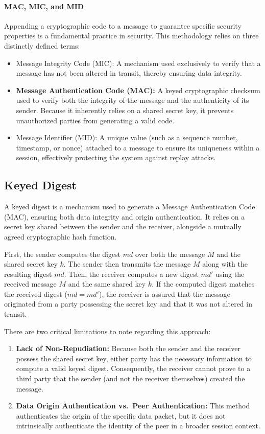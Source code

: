 \paragraph{MAC, MIC, and MID}
Appending a cryptographic code to a message to guarantee specific security properties is a fundamental practice in security. This methodology relies on three distinctly defined terms:
\begin{itemize}
    \item Message Integrity Code (MIC): A mechanism used exclusively to verify that a message has not been altered in transit, thereby ensuring data integrity.
    \item \textbf{Message Authentication Code (MAC):} A keyed cryptographic checksum used to verify both the integrity of the message and the authenticity of its sender. Because it inherently relies on a shared secret key, it prevents unauthorized parties from generating a valid code.
    \item Message Identifier (MID): A unique value (such as a sequence number, timestamp, or nonce) attached to a message to ensure its uniqueness within a session, effectively protecting the system against replay attacks.
\end{itemize}

\subsection{Keyed Digest}
A keyed digest is a mechanism used to generate a Message Authentication Code (MAC), ensuring both data integrity and origin authentication. It relies on a secret key shared between the sender and the receiver, alongside a mutually agreed cryptographic hash function.

First, the sender computes the digest $md$ over both the message $M$ and the shared secret key $k$. The sender then transmits the message $M$ along with the resulting digest $md$. Then, the receiver computes a new digest $md'$ using the received message $M$ and the same shared key $k$. If the computed digest matches the received digest ($md = md'$), the receiver is assured that the message originated from a party possessing the secret key and that it was not altered in transit.


There are two critical limitations to note regarding this approach:
\begin{enumerate}
    \item \textbf{Lack of Non-Repudiation:} Because both the sender and the receiver possess the shared secret key, either party has the necessary information to compute a valid keyed digest. Consequently, the receiver cannot prove to a third party that the sender (and not the receiver themselves) created the message.
    \item \textbf{Data Origin Authentication vs.\ Peer Authentication:} This method authenticates the origin of the specific data packet, but it does not intrinsically authenticate the identity of the peer in a broader session context.
\end{enumerate}

